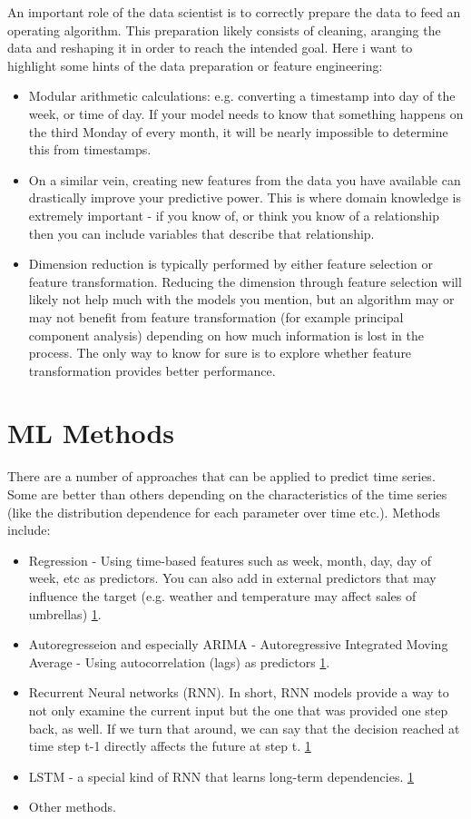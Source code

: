 \documentclass[11pt,fleqn]{book} %
\begin{document}
An important role of the data scientist is to correctly prepare the data to feed an operating algorithm. This preparation likely consists of cleaning, aranging the data and reshaping it in order to reach the intended goal. Here i want to highlight some hints of the data preparation or feature engineering:

\begin{itemize}
\item Modular arithmetic calculations: e.g. converting a timestamp into day of the week, or time of day. If your model needs to know that something happens on the third Monday of every month, it will be nearly impossible to determine this from timestamps.

\item On a similar vein, creating new features from the data you have available can drastically improve your predictive power. This is where domain knowledge is extremely important - if you know of, or think you know of a relationship then you can include variables that describe that relationship. 

\item Dimension reduction is typically performed by either feature selection or feature transformation. Reducing the dimension through feature selection will likely not help much with the models you mention, but an algorithm may or may not benefit from feature transformation (for example principal component analysis) depending on how much information is lost in the process. The only way to know for sure is to explore whether feature transformation provides better performance.
\end{itemize}


\section{ML Methods}

There are a number of approaches that can be applied to predict time series. Some are better than others depending on the characteristics of the time series (like the distribution dependence for each parameter over time etc.). Methods include:
\begin{itemize}
\item Regression - Using time-based features such as week, month, day, day of week, etc as predictors. You can also add in external predictors that may influence the target (e.g. weather and temperature may affect sales of umbrellas) \ref{}.
\item Autoregresseion and especially ARIMA - Autoregressive Integrated Moving Average - Using autocorrelation (lags) as predictors \ref{}.
\item Recurrent Neural networks (RNN). In short, RNN models provide a way to not only examine the current input but the one that was provided one step back, as well. If we turn that around, we can say that the decision reached at time step t-1 directly affects the future at step t. \ref{}
\item LSTM - a special kind of RNN that learns long-term dependencies. \ref{}
\item Other methods.
\end{itemize}
\end{document}
